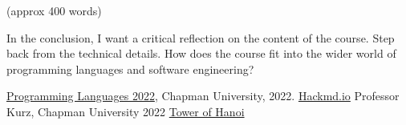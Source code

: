 \documentclass{article}
\theoremstyle{theorem}
\theoremstyle{definition}
\theoremstyle{remark}
\begin{document}
(approx 400 words)

In the conclusion, I want a critical reflection on the content of the course. Step back from the technical details. How does the course fit into the wider world of programming languages and software engineering?

\begin{thebibliography}{99}
 \href{https://github.com/alexhkurz/programming-languages-2022/blob/main/README.md}{Programming Languages 2022}, Chapman University, 2022.\newline
\newline
\href{https://hackmd.io/@alexhkurz/H1jUka4Gv#fn2}{Hackmd.io} Professor Kurz, Chapman University 2022\newline\newline
\href{https://www.mathsisfun.com/games/towerofhanoi.html}{Tower of Hanoi}\newline
\end{thebibliography}
\end{document}
